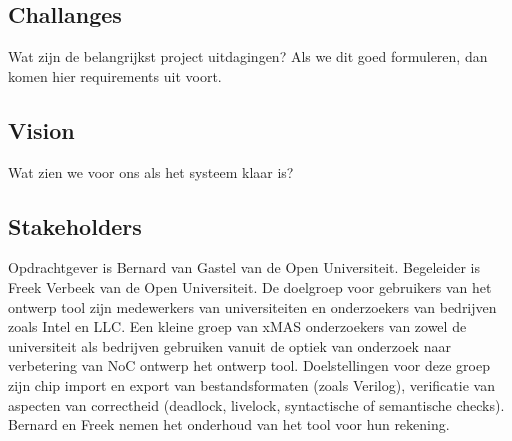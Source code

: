 \documentclass[a4paper,11pt,twoside,draft]{article}
\begin{document}
\subsection{Challanges}

Wat zijn de belangrijkst project uitdagingen? Als we dit goed formuleren, dan komen hier
requirements uit voort.

\subsection{Vision}

Wat zien we voor ons als het systeem klaar is?

\subsection{Stakeholders}

Opdrachtgever is Bernard van Gastel van de Open Universiteit. Begeleider is Freek Verbeek van de Open Universiteit.
De doelgroep voor gebruikers van het ontwerp tool zijn medewerkers van universiteiten en onderzoekers van bedrijven zoals
Intel en LLC. Een kleine groep van xMAS onderzoekers van zowel de universiteit als bedrijven gebruiken vanuit de optiek
van onderzoek naar verbetering van NoC ontwerp het ontwerp tool. Doelstellingen voor deze groep zijn chip import
en export van bestandsformaten (zoals Verilog), verificatie van aspecten van correctheid (deadlock, livelock,
syntactische of semantische checks). Bernard en Freek nemen het onderhoud van het tool voor hun rekening.

\end{document}
